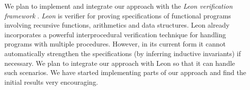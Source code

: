 We plan to implement and integrate our approach with the \emph{Leon verification framework} 
\cite{psuter:SAS11}.
\emph{Leon} is verifier for proving specifications of functional programs involving 
recursive functions, arithmetics and data structures. 
Leon already incorporates a powerful interprocedural verification technique for handling 
programs with multiple procedures.
However, in its current form it cannot automatically  strengthen the specifications (by inferring inductive
invariants) if necessary. We plan to integrate our approach with Leon so that it can handle such scenarios. 
We have started implementing parts of our approach and find the initial results very encouraging.